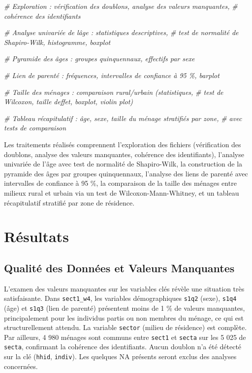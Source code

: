 \documentclass[
  11pt,
]{article}
\newenvironment{Shaded}{\begin{snugshade}}{\end{snugshade}}
\newcommand{\CommentTok}[1]{\textcolor[rgb]{0.56,0.35,0.01}{\textit{#1}}}
\begin{document}
\begin{Shaded}
\begin{Highlighting}[]
\CommentTok{\# Exploration : vérification des doublons, analyse des valeurs manquantes,}
\CommentTok{\# cohérence des identifiants}

\CommentTok{\# Analyse univariée de l\textquotesingle{}âge : statistiques descriptives,}
\CommentTok{\# test de normalité de Shapiro{-}Wilk, histogramme, boxplot}

\CommentTok{\# Pyramide des âges : groupes quinquennaux, effectifs par sexe}

\CommentTok{\# Lien de parenté : fréquences, intervalles de confiance à 95 \%, barplot}

\CommentTok{\# Taille des ménages : comparaison rural/urbain (statistiques,}
\CommentTok{\# test de Wilcoxon, taille d\textquotesingle{}effet, boxplot, violin plot)}

\CommentTok{\# Tableau récapitulatif : âge, sexe, taille du ménage stratifiés par zone,}
\CommentTok{\# avec tests de comparaison}
\end{Highlighting}
\end{Shaded}

Les traitements réalisés comprennent l'exploration des fichiers
(vérification des doublons, analyse des valeurs manquantes, cohérence
des identifiants), l'analyse univariée de l'âge avec test de normalité
de Shapiro-Wilk, la construction de la pyramide des âges par groupes
quinquennaux, l'analyse des liens de parenté avec intervalles de
confiance à 95 \%, la comparaison de la taille des ménages entre milieux
rural et urbain via un test de Wilcoxon-Mann-Whitney, et un tableau
récapitulatif stratifié par zone de résidence.

\section{Résultats}\label{ruxe9sultats}

\subsection{Qualité des Données et Valeurs
Manquantes}\label{qualituxe9-des-donnuxe9es-et-valeurs-manquantes}

L'examen des valeurs manquantes sur les variables clés révèle une
situation très satisfaisante. Dans \texttt{sect1\_w4}, les variables
démographiques \texttt{s1q2} (sexe), \texttt{s1q4} (âge) et
\texttt{s1q3} (lien de parenté) présentent moins de 1 \% de valeurs
manquantes, principalement pour les individus partis ou non membres du
ménage, ce qui est structurellement attendu. La variable \texttt{sector}
(milieu de résidence) est complète. Par ailleurs, 4 980 ménages sont
communs entre \texttt{sect1} et \texttt{secta} sur les 5 025 de
\texttt{secta}, confirmant la cohérence des identifiants. Aucun doublon
n'a été détecté sur la clé (\texttt{hhid}, \texttt{indiv}). Les quelques
NA présents seront exclus des analyses concernées.
\end{document}
